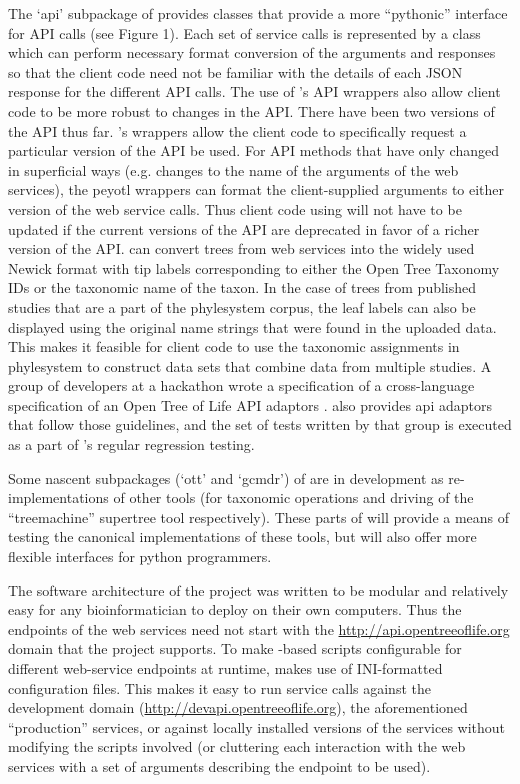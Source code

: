 \begin{methods}
The `api' subpackage of \pey provides classes that provide a more ``pythonic'' interface 
for \otol API calls (see Figure 1).
Each set of service calls is represented by a class which can perform necessary 
    format conversion of the arguments and responses so that the client code need 
    not be familiar with the details of each JSON response for the different API calls.
The use of \pey's API wrappers also allow client code to be more robust to changes in the API.
There have been two versions of the \otol API thus far.
\Pey's wrappers allow the client code to specifically request a particular version of the API be used.
For API methods that have only changed in superficial ways (e.g. changes to the name of 
the arguments of the web services), the peyotl wrappers can format the client-supplied arguments
to either version of the web service calls.
Thus client code using \pey will not have to be updated if the current versions of the
    API are deprecated in favor of a richer version of the \otol API.
\Pey can convert trees from \otol web services into the widely used Newick format with tip
    labels corresponding to either the Open Tree Taxonomy IDs or the taxonomic name of the taxon.
In the case of trees from published studies that are a part of the phylesystem corpus, the
    leaf labels can also be displayed using the original name strings that were found in
    the uploaded data.
This makes it feasible for client code to use the taxonomic assignments in phylesystem to 
    construct data sets that combine data from multiple studies.
A group of developers at a hackathon wrote a specification of a cross-language specification
of an Open Tree of Life API adaptors \citep{sharedapitests}.
\pey also provides api adaptors that follow those guidelines, and the set of
    tests written by that group is executed as a part of \pey's regular regression testing.


Some nascent subpackages (`ott' and `gcmdr') of \pey are in development as re-implementations
    of other \otol tools (for taxonomic operations and driving of the ``treemachine'' supertree tool
    respectively).
These parts of \pey will provide a means of testing the canonical implementations of these
    tools, but will also offer more flexible interfaces for python programmers.

The software architecture of the \otol project was written to be modular and relatively 
    easy for any bioinformatician to deploy on their own computers.
Thus the endpoints of the \otol web services need not start with the \url{http://api.opentreeoflife.org} domain that the project supports.
To make \pey-based scripts configurable for different web-service endpoints at runtime, \pey
    makes use of INI-formatted configuration files.
This makes it easy to run service calls against the development domain (\url{http://devapi.opentreeoflife.org}), the aforementioned ``production'' services, or against locally installed
versions of the services without modifying the scripts involved (or cluttering each interaction with the web services with a set of arguments describing the endpoint to be used).

\end{methods}
